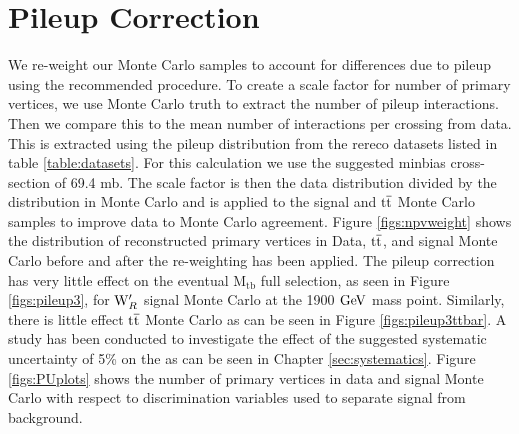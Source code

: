 \section{Pileup Correction}
\label{sec:pileup}
We re-weight our Monte Carlo samples to account for differences due to pileup using the recommended procedure.  
To create a scale factor for number of primary vertices, we use Monte Carlo truth to extract the number of pileup interactions.  
Then we compare this to the mean number of interactions per crossing from data.  
This is extracted using the pileup distribution from the rereco datasets listed in table \ref{table:datasets}.  
For this calculation we use the suggested minbias cross-section of 69.4 mb.  The scale factor is then 
the data distribution divided by the distribution in Monte Carlo and is applied to the signal and $\mathrm{t\overline{t}}$ Monte Carlo samples to improve 
data to Monte Carlo agreement.
Figure \ref{figs:npvweight} shows the distribution of reconstructed primary vertices in Data, $\mathrm{t\overline{t}}$,
and signal Monte Carlo before and after the re-weighting has been applied. The pileup correction has very little effect on the eventual $\mathrm{M_{tb}}$ full selection, as 
seen in Figure \ref{figs:pileup3}, for $\mathrm{W}^\prime_R$ signal Monte Carlo at the 1900$~\mathrm{GeV}$ mass point. Similarly, there is little effect 
$\mathrm{t\overline{t}}$ Monte Carlo as can be seen in Figure \ref{figs:pileup3ttbar}.  
A study has been conducted to investigate the effect of the suggested systematic uncertainty of 5\% on the  as can be seen in Chapter \ref{sec:systematics}.  
Figure \ref{figs:PUplots} shows the number of primary vertices in data and signal Monte Carlo with respect to discrimination variables used to separate signal from background.


